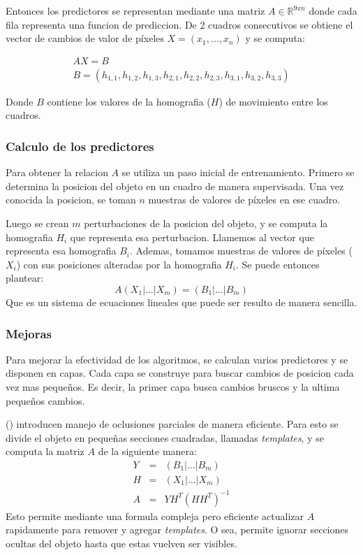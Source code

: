 \documentclass[a4paper,10pt]{article}
\begin{document}
Entonces los predictores se representan mediante una matriz $A \in
\mathbb{R}^{9xn}$ donde cada fila representa una funcion de prediccion.  De 2
cuadros consecutivos se obtiene el vector de cambios de valor de píxeles $X =
(x_1, \dots, x_n)$ y se computa:

\begin{eqnarray*}
    AX = B \\
    B = (h_{1,1}, h_{1,2}, h_{1,3}, h_{2,1}, h_{2,2}, h_{2,3}, h_{3,1}, h_{3,2}, h_{3,3})
\end{eqnarray*}

Donde $B$ contiene los valores de la homografia ($H$) de movimiento entre los cuadros.

\subsubsection{Calculo de los predictores}
Para obtener la relacion $A$ se utiliza un paso inicial de entrenamiento.
Primero se determina la posicion del objeto en un cuadro de manera supervisada.
Una vez conocida la posicion, se toman $n$ muestras de valores de píxeles en ese cuadro.

Luego se crean $m$ perturbaciones de la posicion del objeto, y se computa la homografia $H_i$ que representa esa perturbacion.
Llamemos al vector que representa esa homografia $B_i$.
Ademas, tomamos muestras de valores de píxeles ($X_i$) con sus posiciones alteradas por la homografia $H_i$.
Se puede entonces plantear:
\begin{equation}
    A \left( X_1 \lvert \dots \lvert X_m \right) = \left( B_1 \lvert \dots \lvert B_m \right)
\end{equation}
Que es un sistema de ecuaciones lineales que puede ser resulto de manera sencilla.

\subsubsection{Mejoras}

Para mejorar la efectividad de los algoritmos, se calculan varios predictores y se disponen en capas.
Cada capa se construye para buscar cambios de posicion cada vez mas pequeños.
Es decir, la primer capa busca cambios bruscos y la ultima pequeños cambios.

\citeauthor*{alp} (\cite{alp}) introducen manejo de oclusiones parciales de manera eficiente.
Para esto se divide el objeto en pequeñas secciones cuadradas, llamadas \textit{templates}, y se computa la matriz $A$ de la siguiente manera:
\begin{eqnarray*}
    Y &=& \left( B_1 \lvert \dots \lvert B_m \right) \\
    H &=& \left( X_1 \lvert \dots \lvert X_m \right) \\
    A &=& Y H^T(HH^T)^{-1}
\end{eqnarray*}
Esto permite mediante una formula compleja pero eficiente actualizar $A$ rapidamente para remover y agregar \textit{templates}.
O sea, permite ignorar secciones ocultas del objeto hasta que estas vuelven ser visibles.
\end{document}
